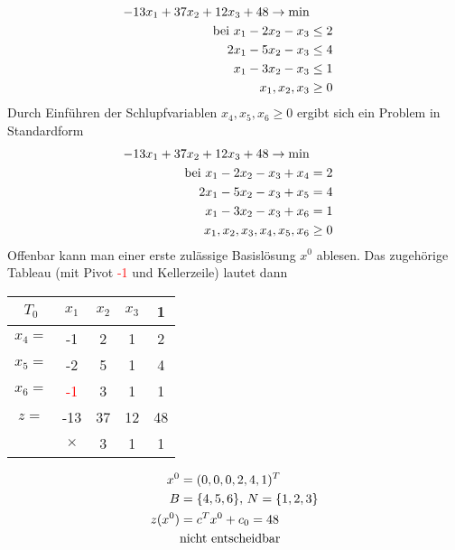 \begin{example}
	\begin{align}
		-13x_1 + 37x_2 + 12x_3 + 48\to\min \notag \\
		\text{bei } x_1-2x_2-x_3 &\le 2 \notag \\
		2x_1-5x_2-x_3 &\le 4 \notag \\
		x_1-3x_2-x_3&\le 1 \notag \\
		x_1,x_2,x_3 &\ge 0 \notag
	\end{align}
	Durch Einführen der Schlupfvariablen $x_4,x_5,x_6\ge 0$ ergibt sich ein Problem in Standardform
	\begin{align}
	-13x_1 + 37x_2 + 12x_3 + 48\to\min \notag \\
	\text{bei } x_1-2x_2-x_3+x_4 &= 2 \notag \\
	2x_1-5x_2-x_3 + x_5 &= 4 \notag \\
	x_1-3x_2-x_3 + x_6&= 1 \notag \\
	x_1,x_2,x_3,x_4,x_5,x_6 &\ge 0 \notag
	\end{align}
	Offenbar kann man einer erste zulässige Basislösung $x^0$ ablesen. Das zugehörige Tableau (mit Pivot \textcolor{red}{-1} und Kellerzeile) lautet dann \\
	\begin{minipage}[c]{0.6\textwidth}
		\begin{center}
			\begin{tabular}{c|ccc|c}
				$T_0$ & $x_1$ & $x_2$ & $x_3$ & 1 \\
				\hline
				$x_4=$ & -1 & 2 & 1 & 2 \\
				\hline 
				$x_5=$ & -2 & 5 & 1 & 4 \\
				\hline 
				$x_6=$ & \textcolor{red}{-1} & 3 & 1 & 1 \\
				\hline
				$z=$ & -13 & 37 & 12 & 48 \\
				\hline
				& $\times$ & 3 & 1 & 1
			\end{tabular}
		\end{center}
	\end{minipage}
	\begin{minipage}[c]{0.3\textwidth}
		\begin{align}
			x^0 &= (0,0,0,2,4,1)^T\notag \\
			B &= \{4,5,6\},\, N=\{1,2,3\}\notag \\
			z(x^0) &= c^Tx^0 + c_0 = 48 \notag \\
			&\text{nicht entscheidbar} \notag 
		\end{align}
	\end{minipage}

\end{example}
